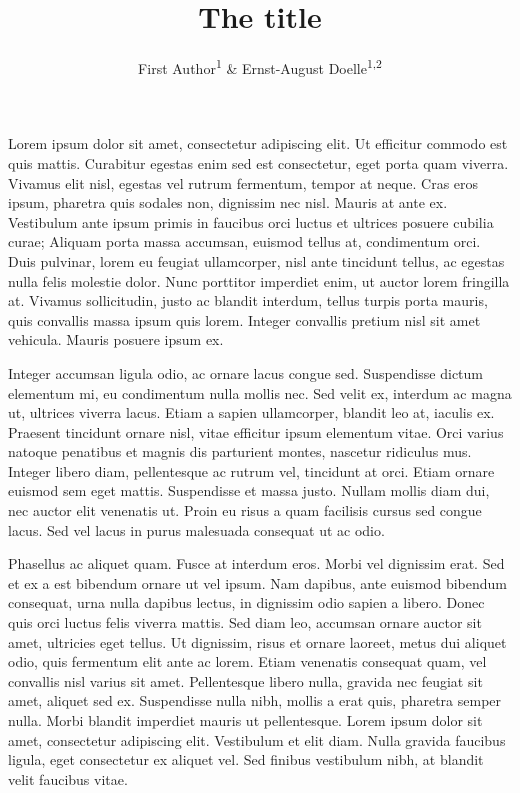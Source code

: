\documentclass[
  english,
  man,floatsintext]{apa6}
\title{The title}
\author{First Author\textsuperscript{1} \& Ernst-August Doelle\textsuperscript{1,2}}
\date{}
\affiliation{\vspace{0.5cm}\textsuperscript{1} Wilhelm-Wundt-University\\\textsuperscript{2} Konstanz Business School}
\begin{document}
\maketitle

Lorem ipsum dolor sit amet, consectetur adipiscing elit. Ut efficitur commodo est quis mattis. Curabitur egestas enim sed est consectetur, eget porta quam viverra. Vivamus elit nisl, egestas vel rutrum fermentum, tempor at neque. Cras eros ipsum, pharetra quis sodales non, dignissim nec nisl. Mauris at ante ex. Vestibulum ante ipsum primis in faucibus orci luctus et ultrices posuere cubilia curae; Aliquam porta massa accumsan, euismod tellus at, condimentum orci. Duis pulvinar, lorem eu feugiat ullamcorper, nisl ante tincidunt tellus, ac egestas nulla felis molestie dolor. Nunc porttitor imperdiet enim, ut auctor lorem fringilla at. Vivamus sollicitudin, justo ac blandit interdum, tellus turpis porta mauris, quis convallis massa ipsum quis lorem. Integer convallis pretium nisl sit amet vehicula. Mauris posuere ipsum ex.

Integer accumsan ligula odio, ac ornare lacus congue sed. Suspendisse dictum elementum mi, eu condimentum nulla mollis nec. Sed velit ex, interdum ac magna ut, ultrices viverra lacus. Etiam a sapien ullamcorper, blandit leo at, iaculis ex. Praesent tincidunt ornare nisl, vitae efficitur ipsum elementum vitae. Orci varius natoque penatibus et magnis dis parturient montes, nascetur ridiculus mus. Integer libero diam, pellentesque ac rutrum vel, tincidunt at orci. Etiam ornare euismod sem eget mattis. Suspendisse et massa justo. Nullam mollis diam dui, nec auctor elit venenatis ut. Proin eu risus a quam facilisis cursus sed congue lacus. Sed vel lacus in purus malesuada consequat ut ac odio.

Phasellus ac aliquet quam. Fusce at interdum eros. Morbi vel dignissim erat. Sed et ex a est bibendum ornare ut vel ipsum. Nam dapibus, ante euismod bibendum consequat, urna nulla dapibus lectus, in dignissim odio sapien a libero. Donec quis orci luctus felis viverra mattis. Sed diam leo, accumsan ornare auctor sit amet, ultricies eget tellus. Ut dignissim, risus et ornare laoreet, metus dui aliquet odio, quis fermentum elit ante ac lorem. Etiam venenatis consequat quam, vel convallis nisl varius sit amet. Pellentesque libero nulla, gravida nec feugiat sit amet, aliquet sed ex. Suspendisse nulla nibh, mollis a erat quis, pharetra semper nulla. Morbi blandit imperdiet mauris ut pellentesque. Lorem ipsum dolor sit amet, consectetur adipiscing elit. Vestibulum et elit diam. Nulla gravida faucibus ligula, eget consectetur ex aliquet vel. Sed finibus vestibulum nibh, at blandit velit faucibus vitae.
\end{document}
